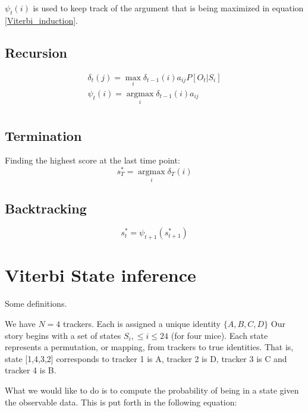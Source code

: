 \documentclass[12pt]{article}
\begin{document}
${\psi _t}\left( i \right)$ is used to keep track of the argument that is being maximized in equation \ref{Viterbi_induction}.

\subsection{Recursion}

\begin{equation}
\label{rec}
\begin{array}{l}
 {\delta _t}\left( j \right) = \mathop {\max }\limits_i {\delta _{t - 1}}\left( i \right){a_{ij}}P\left[ {{O_t}|{S_i}} \right] \\
 {\psi _t}\left( i \right) = \mathop {\arg \max }\limits_i {\delta _{t - 1}}\left( i \right){a_{ij}} \\
 \end{array}
 \end{equation}

\subsection{Termination}
Finding the highest score at the last time point:
\begin{equation}
\label{termination}
s_T^* = \mathop {\arg \max }\limits_i {\delta _T}\left( i \right)
 \end{equation}

\subsection{Backtracking}
\begin{equation}
s_t^* = {\psi _{t + 1}}\left( {s_{t + 1}^*} \right)
 \end{equation}



\section{Viterbi State inference}

Some definitions.

We have $N = 4$ trackers. Each is assigned a unique identity $\{A,B,C,D\}$
Our story begins with a set of states $S_i, \le i \le 24$ (for four mice). Each state represents a permutation, or mapping, from trackers to true identities. That is, state [1,4,3,2] corresponds to tracker 1 is A, tracker 2 is D, tracker 3 is C and tracker 4 is B.

What we would like to do is to compute the probability of being in a state given the observable data.
This is put forth in the following equation:
\end{document}
